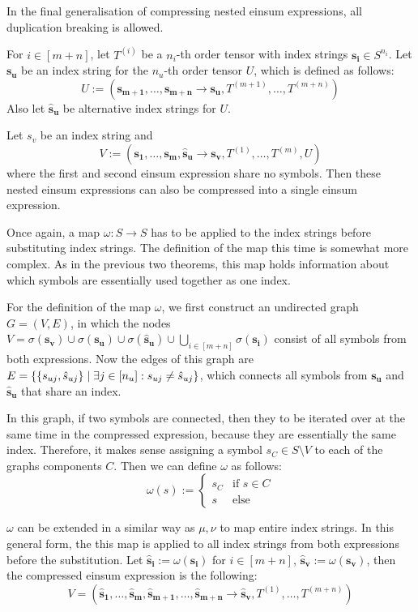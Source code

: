 In the final generalisation of compressing nested einsum expressions, all duplication breaking is allowed.

\begin{theorem}
    For $i \in [m + n]$, let $T^{(i)}$ be a $n_i$-th order tensor with index strings $\bm{s_i} \in S^{n_i}$.
    Let $\bm{s_u}$ be an index string for the $n_u$-th order tensor $U$, which is defined as follows:
    $$U := (\bm{s_{m + 1}},\dots,\bm{s_{m + n}} \rightarrow \bm{s_u}, T^{(m + 1)},\dots,T^{(m + n)})$$
    Also let $\bm{\hat{s}_u}$ be alternative index strings for $U$.

    Let $s_v$ be an index string and
    $$V := (\bm{s_1},\dots,\bm{s_m}, \bm{\hat{s}_u} \rightarrow \bm{s_v}, T^{(1)},\dots,T^{(m)}, U)$$
    where the first and second einsum expression share no symbols.
    Then these nested einsum expressions can also be compressed into a single einsum expression.

    Once again, a map $\omega: S \rightarrow S$ has to be applied to the index strings before substituting index strings.
    The definition of the map this time is somewhat more complex.
    As in the previous two theorems, this map holds information about which symbols are essentially used together as one index.

    For the definition of the map $\omega$, we first construct an undirected graph $G = (V, E)$,
    in which the nodes $V = \sigma(\bm{s_v}) \cup \sigma(\bm{s_u}) \cup \sigma(\bm{\hat{s}_u}) \cup \bigcup_{i \in [m + n]} \sigma(\bm{s_i})$ consist of all symbols from both expressions.
    Now the edges of this graph are $E = \lbrace \lbrace s_{uj}, \hat{s}_{uj} \rbrace \mid \exists j \in [n_u]: s_{uj} \neq \hat{s}_{uj} \rbrace$,
    which connects all symbols from $\bm{s_u}$ and $\bm{\hat{s}_u}$ that share an index.

    In this graph, if two symbols are connected, then they to be iterated over at the same time in the compressed expression, because they are essentially the same index.
    Therefore, it makes sense assigning a symbol $s_C \in S \setminus V$ to each of the graphs components $C$.
    Then we can define $\omega$ as follows:
    $$\omega(s) := \begin{cases}
        s_C & \text{if } s \in C \\
        s   & \text{else}
    \end{cases}$$

    $\omega$ can be extended in a similar way as $\mu, \nu$ to map entire index strings.
    In this general form, the this map is applied to all index strings from both expressions before the substitution.
    Let $\bm{\hat{s}_i} := \omega(\bm{s_i})$ for $i \in [m + n]$, $\bm{\hat{s}_v} := \omega(\bm{s_v})$, then the compressed einsum expression is the following:
    $$V = (\bm{\hat{s}_1},\dots,\bm{\hat{s}_m}, \bm{\hat{s}_{m + 1}}, \dots, \bm{\hat{s}_{m + n}} \rightarrow \bm{\hat{s}_v}, T^{(1)},\dots,T^{(m + n)})$$
\end{theorem}
